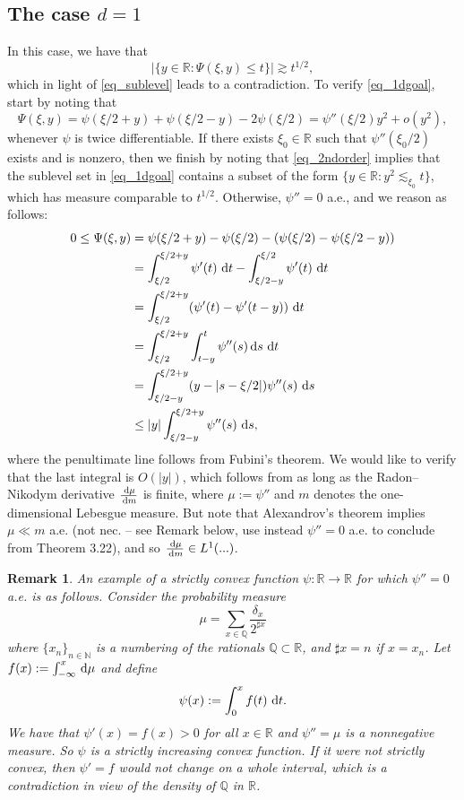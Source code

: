 \documentclass[11pt]{amsart}
\renewcommand{\d}{\,{\rm d}}
\def\R{\mathbb{R}}
\def\N{\mathbb{N}}
\newtheorem{remark}[theorem]{Remark}
\begin{document}
\subsection{The case $d=1$}
In this case, we have that 
\begin{equation}\label{eq_1dgoal}
    |\{y\in\R:\Psi(\xi,y)\leq t\}|\gtrsim t^{1/2},
\end{equation}
which in light of \eqref{eq_sublevel} leads to a contradiction.
To verify  \eqref{eq_1dgoal}, start by noting that 
\begin{equation}\label{eq_2ndorder}
    \Psi(\xi,y)=\psi(\xi/2+y)+\psi(\xi/2-y)-2\psi(\xi/2)
=\psi''(\xi/2)y^2+o(y^2),
\end{equation}
whenever $\psi$ is twice differentiable.
If there exists $\xi_0\in\R$ such that $\psi''(\xi_0/2)$ exists and is nonzero, then we finish by noting that \eqref{eq_2ndorder} implies that the sublevel set in \eqref{eq_1dgoal} contains a subset of the form $\{y\in\R: y^2\lesssim_{\xi_0} t\}$, which has measure comparable to $t^{1/2}$.
Otherwise, $\psi''=0$ a.e., and we reason as follows:
\begin{align*}
  0\leq \Psi(\xi,y)
   &=\psi(\xi/2+y)-\psi(\xi/2) -(\psi(\xi/2)-\psi(\xi/2-y))\\
   &=\int_{\xi/2}^{\xi/2+y}\psi'(t)\,\d t-\int_{\xi/2-y}^{\xi/2}\psi'(t)\,\d t\\
   &=\int_{\xi/2}^{\xi/2+y} (\psi'(t)-\psi'(t-y))\,\d t\\
   &=\int_{\xi/2}^{\xi/2+y} \int_{t-y}^t \psi''(s)\d s\,\d t\\
   &=\int_{\xi/2-y}^{\xi/2+y} (y-|s-\xi/2|)\psi''(s)\,\d s\\
   &\leq |y| \int_{\xi/2-y}^{\xi/2+y} \psi''(s)\,\d s,
\end{align*}
where the penultimate line follows from Fubini's theorem. We would like to verify that the last integral is $O(|y|)$, which  follows from \cite[Theorem 3.22]{Fo99} as long as the Radon--Nikodym derivative $\frac{\d\mu}{\d m}$ is finite, where $\mu:=\psi''$ and $m$ denotes the one-dimensional Lebesgue measure. But note that Alexandrov's theorem implies  $\mu\ll m$ a.e. (not nec. -- see Remark below, use instead $\psi''=0$ a.e. to conclude from Theorem 3.22), and so $\frac{\d\mu}{\d m}\in L^1(...)$.

\begin{remark}
    An example of a strictly convex function $\psi:\R\to\R$ for which $\psi''=0$ a.e. is as follows. Consider the probability measure
    \[\mu=\sum_{x\in\mathbb Q}\frac{\delta_x}{2^{\sharp x}}\]
    where $\{x_n\}_{n\in\N}$ is a numbering of the rationals $\mathbb Q\subset\R$, and $\sharp x=n$ if $x=x_n$. Let $f(x):=\int_{-\infty}^x\d\mu$ and define 
    \[\psi(x):=\int_0^x f(t)\,\d t.\]
    We have that $\psi'(x)=f(x)>0$ for all $x\in\R$ and $\psi''=\mu$ is a nonnegative measure. So $\psi$ is a strictly increasing convex function. If it were not strictly convex, then $\psi'=f$ would not change on a whole interval, which is a contradiction in view of the density of $\mathbb Q$ in $\R$.
\end{remark}
\end{document}
